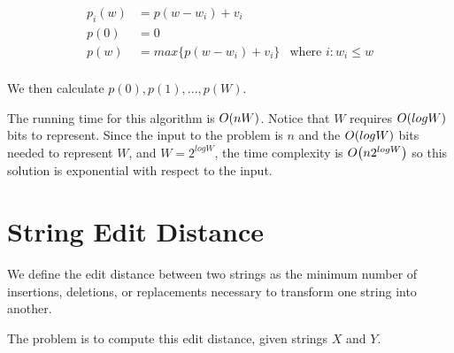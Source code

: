 \begin{align*}
  p_i(w) &= p(w - w_i) + v_i & \\
  p(0)   &= 0 & \\
  p(w)   &= max \{ p(w - w_i) + v_i \} & \text{where $i : w_i \leq w$} \\
\end{align*}

We then calculate $p(0), p(1), ..., p(W)$.

The running time for this algorithm is $O\!\left(nW\right)$.  Notice that $W$
requires $O\!\left(logW\right)$ bits to represent.  Since the input to the
problem is $n$ and the $O\!\left(logW\right)$ bits needed to represent $W$,
and $W = 2^{logW}$, the time complexity is $O\!\left(n2^{logW}\right)$ so
this solution is exponential with respect to the input.

\section{String Edit Distance}

We define the edit distance between two strings as the minimum number
of insertions, deletions, or replacements necessary to transform one
string into another.

The problem is to compute this edit distance, given strings $X$ and
$Y$.


